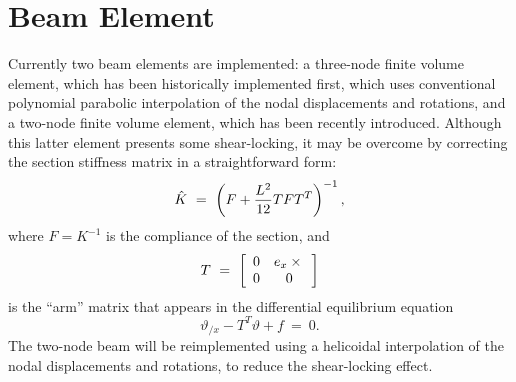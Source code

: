 \section{Beam Element}
Currently two beam elements are implemented: a three-node finite volume
element, which has been historically implemented first, which uses
conventional polynomial parabolic interpolation of the nodal displacements
and rotations, and a two-node finite volume element, which has been
recently introduced.
Although this latter element presents some shear-locking, it may be overcome
by correcting the section stiffness matrix in a straightforward form:
\begin{displaymath}
	\hat{K} \ = \ \plbr{F + \frac{L^2}{12}T F T^T}^{-1} ,
\end{displaymath}
where $F=K^{-1}$ is the compliance of the section, and
\begin{displaymath}
	T \ = \ \sqbr{\matr{cc}{
		0 & e_x \times{} \\
		0 & 0
	}}
\end{displaymath}
is the ``arm'' matrix that appears in the differential equilibrium equation
\begin{displaymath}
	\vartheta_{/x} - T^T\vartheta + f \ = \ 0 .
\end{displaymath}
The two-node beam will be reimplemented using a helicoidal interpolation
of the nodal displacements and rotations, to reduce the shear-locking effect.

